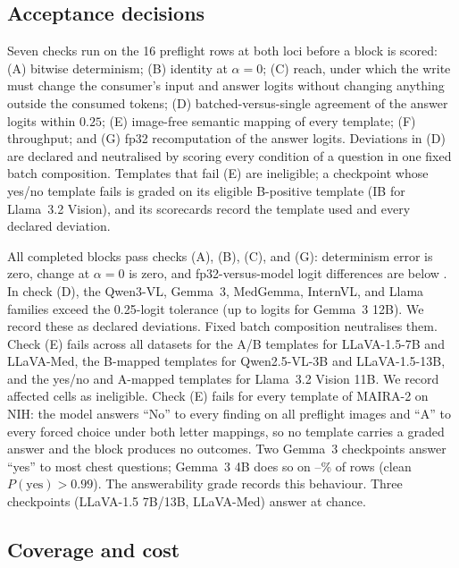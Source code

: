 \documentclass{article}
\begin{document}
\subsection{Acceptance decisions}
\label{app:cf-gates}

Seven checks run on the 16 preflight rows at both loci before a block is scored: (A) bitwise determinism; (B) identity at $\alpha=0$; (C) reach, under which the write must change the consumer's input and answer logits without changing anything outside the consumed tokens; (D) batched-versus-single agreement of the answer logits within $0.25$; (E) image-free semantic mapping of every template; (F) throughput; and (G) fp32 recomputation of the answer logits. Deviations in (D) are declared and neutralised by scoring every condition of a question in one fixed batch composition. Templates that fail (E) are ineligible; a checkpoint whose yes/no template fails is graded on its eligible B-positive template (IB for Llama~3.2 Vision), and its scorecards record the template used and every declared deviation.

All \cfWriteBlocks{} completed blocks pass checks (A), (B), (C), and (G): determinism error is zero, change at $\alpha=0$ is zero, and fp32-versus-model logit differences are below \cfGateFpMax{}. In check (D), the Qwen3-VL, Gemma~3, MedGemma, InternVL, and Llama families exceed the 0.25-logit tolerance (up to \cfGateBatchMax{} logits for Gemma~3 12B). We record these as declared deviations. Fixed batch composition neutralises them. Check (E) fails across all datasets for the A/B templates for LLaVA-1.5-7B and LLaVA-Med, the B-mapped templates for Qwen2.5-VL-3B and LLaVA-1.5-13B, and the yes/no and A-mapped templates for Llama~3.2 Vision 11B. We record affected cells as ineligible. Check (E) fails for every template of MAIRA-2 \citep{bannur2024maira} on NIH: the model answers ``No'' to every finding on all \cfSpecUngradedRows{} preflight images and ``A'' to every forced choice under both letter mappings, so no template carries a graded answer and the block produces no outcomes. Two Gemma~3 checkpoints answer ``yes'' to most chest questions; Gemma~3 4B does so on \cfGemmaFourYesMin--\cfGemmaFourYesMax\% of rows (clean $P(\mathrm{yes})>0.99$). The answerability grade records this behaviour. Three checkpoints (LLaVA-1.5 7B/13B, LLaVA-Med) answer at chance.

\subsection{Coverage and cost}
\label{app:cf-coverage}
\end{document}
